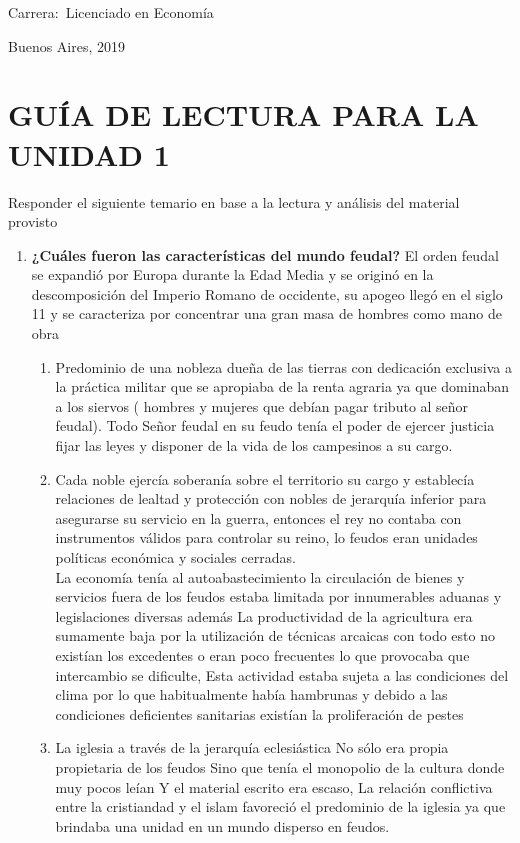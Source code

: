 \documentclass[12pt]{book}
\begin{document}
\noindent Carrera:\,	Licenciado en Econom\'ia

\vspace{1cm}

\vspace{1cm}

\noindent Buenos Aires, 2019

\newpage


\tableofcontents

\chapter{GUÍA DE LECTURA PARA LA UNIDAD 1}

Responder el siguiente temario en base a la lectura y análisis del material provisto

\begin{enumerate}
\item \textbf{¿Cuáles fueron las características del mundo feudal?}
El orden feudal se expandió por Europa durante la Edad Media y se originó en la descomposición del Imperio Romano de occidente, su apogeo llegó en el siglo 11 y se caracteriza por concentrar una gran masa de hombres como mano de obra 
\\
\begin{enumerate}

\item Predominio de una nobleza dueña de las tierras con dedicación exclusiva a la práctica militar que se apropiaba de la renta agraria ya que dominaban a los siervos ( hombres y mujeres que debían pagar tributo al señor feudal).  Todo Señor feudal en su feudo tenía el poder de ejercer justicia fijar las leyes y disponer de la vida de los campesinos a su cargo.
\item Cada noble ejercía soberanía sobre el territorio su cargo y establecía relaciones de lealtad y protección con nobles de jerarquía inferior para asegurarse su servicio en la guerra, entonces el rey no contaba con instrumentos válidos para controlar su reino,  lo feudos eran unidades políticas económica y sociales cerradas. \\
La economía tenía al autoabastecimiento la circulación de bienes y servicios fuera de los feudos estaba limitada por innumerables aduanas y legislaciones diversas además La productividad de la agricultura era sumamente baja por la utilización de técnicas arcaicas con todo esto no existían los excedentes o eran poco frecuentes lo que provocaba que intercambio se dificulte, Esta actividad estaba sujeta a las condiciones del clima por lo que habitualmente había hambrunas y debido a las condiciones deficientes sanitarias existían la proliferación de pestes 
\item La iglesia a través de la jerarquía eclesiástica No sólo era  propia propietaria de los feudos Sino que tenía el monopolio de la cultura donde muy pocos leían Y el material escrito era escaso, La relación conflictiva entre la cristiandad y el islam favoreció el predominio de la iglesia ya que brindaba una unidad en un mundo disperso en feudos.
\end{enumerate}



\end{enumerate}
\end{document}
